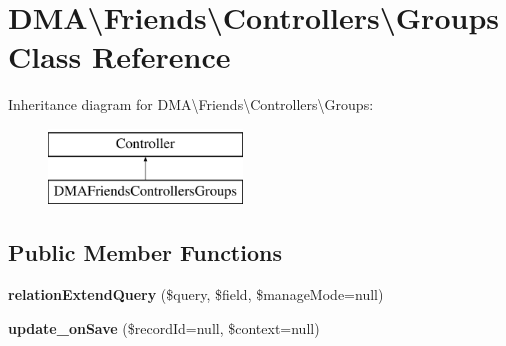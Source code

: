 \hypertarget{classDMA_1_1Friends_1_1Controllers_1_1Groups}{}\section{D\+M\+A\textbackslash{}Friends\textbackslash{}Controllers\textbackslash{}Groups Class Reference}
\label{classDMA_1_1Friends_1_1Controllers_1_1Groups}
Inheritance diagram for D\+M\+A\textbackslash{}Friends\textbackslash{}Controllers\textbackslash{}Groups\+:\begin{figure}[H]
\begin{center}
\leavevmode
\includegraphics[height=2.000000cm]{d3/d59/classDMA_1_1Friends_1_1Controllers_1_1Groups}
\end{center}
\end{figure}
\subsection*{Public Member Functions}
\begin{DoxyCompactItemize}
\item 
\hypertarget{classDMA_1_1Friends_1_1Controllers_1_1Groups_ad413fbb0ad883ebc7a7faa208b70c0e9}{}{\bfseries relation\+Extend\+Query} (\$query, \$field, \$manage\+Mode=null)\label{classDMA_1_1Friends_1_1Controllers_1_1Groups_ad413fbb0ad883ebc7a7faa208b70c0e9}

\item 
\hypertarget{classDMA_1_1Friends_1_1Controllers_1_1Groups_a89cddf39d6b3998a33eb447b0715a58a}{}{\bfseries update\+\_\+on\+Save} (\$record\+Id=null, \$context=null)\label{classDMA_1_1Friends_1_1Controllers_1_1Groups_a89cddf39d6b3998a33eb447b0715a58a}

\end{DoxyCompactItemize}
